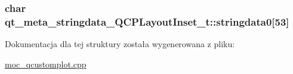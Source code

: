 \subsubsection[{\texorpdfstring{stringdata0}{stringdata0}}]{\setlength{\rightskip}{0pt plus 5cm}char qt\+\_\+meta\+\_\+stringdata\+\_\+\+Q\+C\+P\+Layout\+Inset\+\_\+t\+::stringdata0\mbox{[}53\mbox{]}}\hypertarget{structqt__meta__stringdata___q_c_p_layout_inset__t_a7cc558fa6388df25517a33006f4a76a2}{}\label{structqt__meta__stringdata___q_c_p_layout_inset__t_a7cc558fa6388df25517a33006f4a76a2}


Dokumentacja dla tej struktury została wygenerowana z pliku\+:\begin{DoxyCompactItemize}
\item 
\hyperlink{moc__qcustomplot_8cpp}{moc\+\_\+qcustomplot.\+cpp}\end{DoxyCompactItemize}
